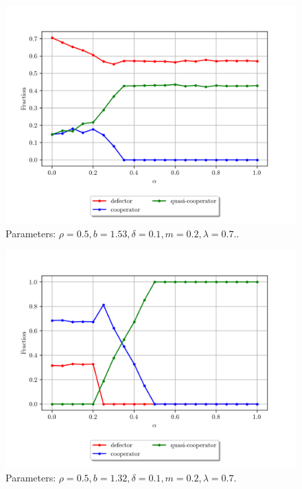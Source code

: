 \documentclass{article}
\begin{document}
 \begin{figure}[h!t]
    \centering
    \includegraphics[width=\textwidth]{cg_A_200.png}
    \caption{Parameters: $ \rho = 0.5, b = 1.53,  \delta = 0.1, m=0.2, \lambda = 0.7$..}
    \label{fig:alp200}
\end{figure}



 \begin{figure}[h!t]
    \centering
    \includegraphics[width=\textwidth]{Low_b.png}
    \caption{Parameters: $ \rho = 0.5, b = 1.32,  \delta = 0.1, m=0.2, \lambda = 0.7$.}
    \label{fig:onlyCs}
\end{figure}

\clearpage
\end{document}
